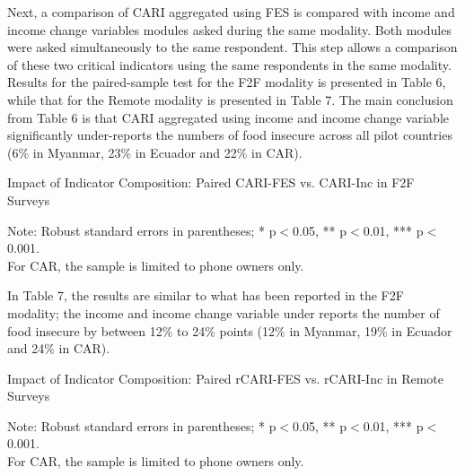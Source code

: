 \documentclass[11pt,harvard]{article}
\begin{document}
Next, a comparison of CARI aggregated using FES is compared with income and income change variables modules asked during the same modality. Both modules were asked simultaneously to the same respondent. This step allows a comparison of these two critical indicators using the same respondents in the same modality. Results for the paired-sample test for the F2F modality is presented in Table 6, while that for the Remote modality is presented in Table 7. The main conclusion from Table 6 is that CARI aggregated using income and income change variable significantly under-reports the numbers of food insecure across all pilot countries (6\% in Myanmar, 23\% in Ecuador and 22\% in CAR).


\begin{table}[htbp]
	\centering
	\begin{adjustbox}{max width=\textwidth}
		\begin{threeparttable}
			\caption{Impact of Indicator Composition: Paired CARI-FES vs. CARI-Inc in F2F Surveys}
			\scriptsize
			 
			\label{tab:Paired_F2F_CARI_FES_INC_All_Country}
			\begin{tablenotes}
				\item Note: Robust standard errors in parentheses; * p$<$0.05, ** p$<$0.01, *** p$<$0.001. \\
				For CAR, the sample is limited to phone owners only.
			\end{tablenotes}
		\end{threeparttable}
	\end{adjustbox}
\end{table}


In Table 7, the results are similar to what has been reported in the F2F modality; the income and income change variable under reports the number of food insecure by between 12\% to 24\% points (12\% in Myanmar, 19\% in Ecuador and 24\% in CAR). 


\begin{table}[htbp]
	\centering
	\begin{adjustbox}{max width=\textwidth}
		\begin{threeparttable}
			\caption{Impact of Indicator Composition: Paired rCARI-FES vs. rCARI-Inc in Remote Surveys}
			\scriptsize
			 
			\label{tab:Paired_RM_rCARI_FES_INC_All_Country}
			\begin{tablenotes}
				\item Note: Robust standard errors in parentheses; * p$<$0.05, ** p$<$0.01, *** p$<$0.001. \\
				For CAR, the sample is limited to phone owners only.
			\end{tablenotes}
		\end{threeparttable}
	\end{adjustbox}
\end{table}
\end{document}
